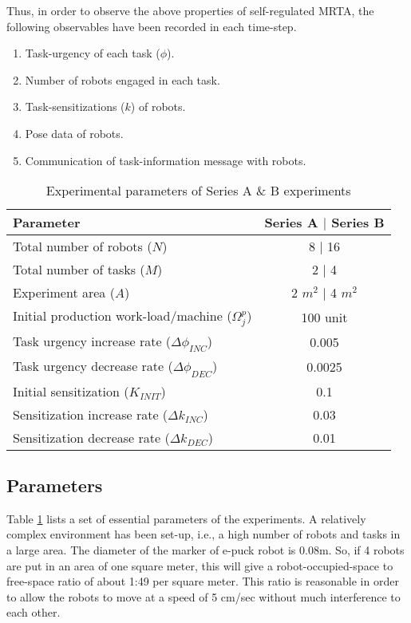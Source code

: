 Thus, in order to observe the above properties of self-regulated MRTA, the following  observables have been recorded in each time-step.
\begin{enumerate}
\item Task-urgency of each task ($\phi$).
\item Number of robots engaged in each task.
\item Task-sensitizations ($k$) of robots.
\item Pose data of robots.
\item Communication of task-information message with robots.  
\end{enumerate}
\begin{table}
\caption{Experimental parameters of Series A \& B experiments}
\label{table:params}
\begin{center}
\begin{tabular}{|l|c|}
\hline Parameter & Series A $\mid$ Series B\\
\hline Total number of robots ($N$) & \hspace*{0.1cm} 8 $\mid$ 16\\
\hline Total number of tasks ($M$) & 2 $\mid$ 4\\
\hline Experiment area ($A$) & 2 $m^2$ $\mid$  4 $m^2$\\
\hline Initial production work-load/machine ($\Omega_{j}^{p}$) & 100 unit \\
\hline Task urgency increase rate ($\Delta\phi_{INC}$) & 0.005\\
\hline Task urgency decrease rate ($\Delta\phi_{DEC}$) & 0.0025\\
\hline Initial sensitization ($K_{INIT}$) & 0.1\\
\hline Sensitization increase rate ($\Delta k_{INC}$) & 0.03\\
\hline Sensitization decrease rate ($\Delta k_{DEC}$) & 0.01\\
\hline
\end{tabular}
\end{center}
\end{table}
\subsection{Parameters}
Table \ref{table:params} lists a set of essential parameters of the experiments. A relatively complex environment has been set-up, i.e., a high number of robots and tasks in a large area. The diameter of the marker of e-puck robot is 0.08m. So, if 4 robots are put in an area of one square meter, this will give a robot-occupied-space to free-space ratio of about 1:49 per square meter. This ratio is reasonable in order to allow the robots to move at a speed of 5 cm/sec without much interference to each other. 

